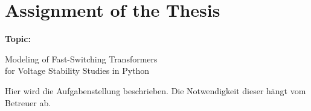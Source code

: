 \chapter*{Assignment of the Thesis}

{\large \textbf{Topic:} \parbox[t]{0.8\textwidth}{Modeling of Fast-Switching Transformers\\for Voltage Stability Studies in Python}}
\newline

Hier wird die Aufgabenstellung beschrieben. Die Notwendigkeit dieser hängt vom Betreuer ab.
